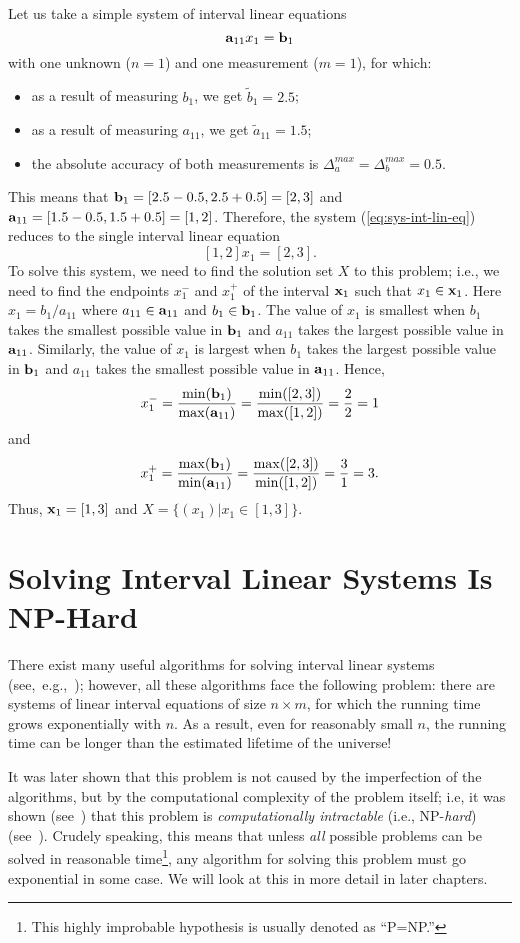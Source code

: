 Let us take a simple system of interval linear equations
$$
  {\bf a}_{11}x_1={\bf b}_1
$$
with one unknown ($n=1$) and one measurement ($m=1$), for which:
\begin{itemize}
\item as a
result of measuring $b_1$, we get $\tilde b_1=2.5$;
\item as a result of measuring $a_{11}$, we get $\tilde a_{11}=1.5$;
\item the absolute accuracy of both measurements is
      $\Delta^{max}_a=\Delta^{max}_b=0.5$.
\end{itemize}
This means that ${\bf b}_1=[2.5-0.5,2.5+0.5]=[2,3]$ and
${\bf a}_{11}=[1.5-0.5,1.5+0.5]=[1,2]$.
Therefore, the system (\ref{eq:sys-int-lin-eq}) reduces to the single interval
linear equation
$$
  [1,2]x_1=[2,3].
$$
To solve this system, we need to find the solution set $X$ to this problem; 
i.e., we need to find the endpoints $x_1^-$ and $x_1^+$ of the interval
${\bf x}_1$ such that $x_1\in{\bf x}_1$.  Here $x_1=b_1/a_{11}$ where
$a_{11}\in{\bf a}_{11}$ and $b_1\in{\bf b}_1$.  The value of $x_1$ is smallest
when $b_1$ takes the smallest possible value in ${\bf b}_1$ and $a_{11}$ takes
the largest possible value in ${\bf a}_{11}$.  Similarly, the value of $x_1$
is largest when $b_1$ takes the largest possible value in ${\bf b}_1$ and
$a_{11}$ takes the smallest possible value in ${\bf a}_{11}$.  Hence,
$$
  x_1^-=\frac{\min({\bf b}_1)}{\max({\bf a}_{11})}
       =\frac{\min([2,3])}{\max([1,2])}=\frac{2}{2}=1
$$
and
$$
  x_1^+=\frac{\max({\bf b}_1)}{\min({\bf a}_{11})}
       =\frac{\max([2,3])}{\min([1,2])}=\frac{3}{1}=3.
$$
Thus, ${\bf x}_1=[1,3]$ and $X=\{(x_1)|x_1\in[1,3]\}$.

\section{Solving Interval Linear Systems Is NP-Hard}

There exist many useful algorithms for solving interval linear
systems (see,~e.g.,~\cite{Neumaier1990}); however, all these algorithms
face the following problem: there are systems of linear interval
equations of size $n\times m$, for which the running time grows exponentially
with $n$.  As a result, even for reasonably small $n$, the running time can
be longer than the estimated lifetime of the universe!

It was later shown that this problem is not caused by the imperfection
of the algorithms, but by the computational complexity of the problem
itself; i.e, it was shown (see~\cite{Kreinovich1993}) that this problem
is {\em computationally intractable\/} (i.e., NP-{\em hard\/})
(see~\cite{Garey1979}). Crudely speaking, this means that unless {\em all\/}
possible problems can be solved in reasonable
time\footnote{This highly improbable hypothesis is usually denoted as 
``P=NP.''}, any algorithm for solving this problem must go exponential in some
case.  We will look at this in more detail in later chapters.

